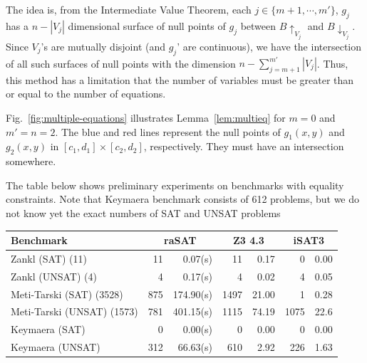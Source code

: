 \documentclass[runningheads,a4paper,oribibl]{llncs}
\begin{document}
The idea is, from the Intermediate Value Theorem,
each $j \in \{m+1, \cdots, m'\}$, $g_j$ has a $n - |V_{j}|$ dimensional surface of
null points of $g_j$ between $B\uparrow_{V_j}$ and $B\downarrow_{V_j}$.
Since $V_j$'s are mutually disjoint (and $g_j$' are continuous),
we have the intersection of all such surfaces of null points with
the dimension $n - \sum_{j=m+1}^{m'} |V_j|$.
Thus, this method has a limitation that 
the number of variables must be greater than or equal to the number of equations.

Fig.~\ref{fig:multiple-equations} illustrates Lemma~\ref{lem:multieq} for $m = 0$ and
$m' = n = 2$. 
The blue and red lines represent the null points of $g_1(x,y)$ and $g_2(x,y)$ in
$[c_1,d_1] \times [c_2,d_2]$, respectively.
They must have an intersection somewhere. %

The table below shows preliminary experiments on benchmarks with equality constraints.
Note that Keymaera benchmark consists of 612 problems, but we do not know yet
the exact numbers of SAT and UNSAT problems 

\begin{center}
\begin{tabular}{ | l | r | r | r | r  | r | r |}
\hline
\multicolumn{1}{|l|}{Benchmark} & \multicolumn{2}{c|}{\bf raSAT} &
\multicolumn{2}{c|}{\bf Z3 4.3} & \multicolumn{2}{c|}{\bf iSAT3}\\
\hline
Zankl (SAT) (11) & 11 & 0.07(s) & 11 & 0.17 & 0 & 0.00 \\
\hline
Zankl (UNSAT) (4) & 4 & 0.17(s) &  4 & 0.02 & 4 & 0.05 \\
\hline
Meti-Tarski (SAT) (3528)   & 875 & 174.90(s) & 1497 & 21.00 & 1 & 0.28  \\
\hline 
Meti-Tarski (UNSAT) (1573) & 781 & 401.15(s) & 1115 & 74.19 & 1075 & 22.6 \\
\hline
Keymaera (SAT)   & 0 & 0.00(s) & 0 & 0.00 & 0 & 0.00 \\
\hline
Keymaera (UNSAT) & 312 & 66.63(s) & 610 & 2.92 & 226 & 1.63\\
\hline 
\end{tabular}
\end{center}
\end{document}
